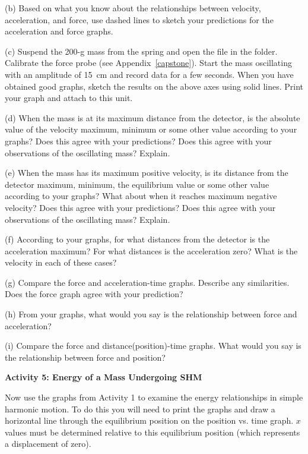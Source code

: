 (b) Based on what you know about the relationships between velocity, 
acceleration, and force, use dashed lines to sketch your predictions for the 
acceleration and force graphs.

(c) Suspend the 200-g mass from the spring and open the file  in the \filename{\coursefolder} folder. Calibrate the force probe (see Appendix~\ref{capstone}).
Start the mass oscillating with an amplitude of 15~cm and record data for a few seconds.
When you have obtained good graphs, sketch the results on the above axes using
solid lines. Print your graph and attach to this unit.

(d) When the mass is at its maximum distance from the detector, is the absolute
 value of the velocity
maximum, minimum or some other value according to your graphs? Does this agree
with your predictions? Does this agree with your observations of the oscillating
mass? Explain.
\answerspace{15mm}

\pagebreak[2]
(e) When the mass has its maximum positive velocity, is its distance from the
detector maximum, minimum, the equilibrium value or some other value according
to your graphs? What about when it reaches maximum negative velocity? Does this
agree with your predictions? Does this agree with your observations of the 
oscillating mass? Explain. 
\answerspace{10mm}

(f) According to your graphs, for what distances from the detector is the 
acceleration maximum? For what distances is the acceleration zero? What is the 
velocity in each of these cases?
\answerspace{20mm}

(g) Compare the force and acceleration-time graphs. Describe any similarities.
Does the force graph agree with your prediction?
\answerspace{20mm}

(h) From your graphs, what would you say is the relationship between force and
acceleration? 
\answerspace{20mm}

(i) Compare the force and distance(position)-time graphs. What would you say
is the relationship between force and position? 
\answerspace{20mm}

\textbf{Activity 5: Energy of a Mass Undergoing SHM }

Now use the graphs from Activity 1 to examine the energy relationships
in simple harmonic motion. To do this you will need to print the graphs and draw a horizontal line through the equilibrium position on the position vs. time graph.  $x$ values must be determined relative to this equilibrium position (which represents a displacement of zero).


